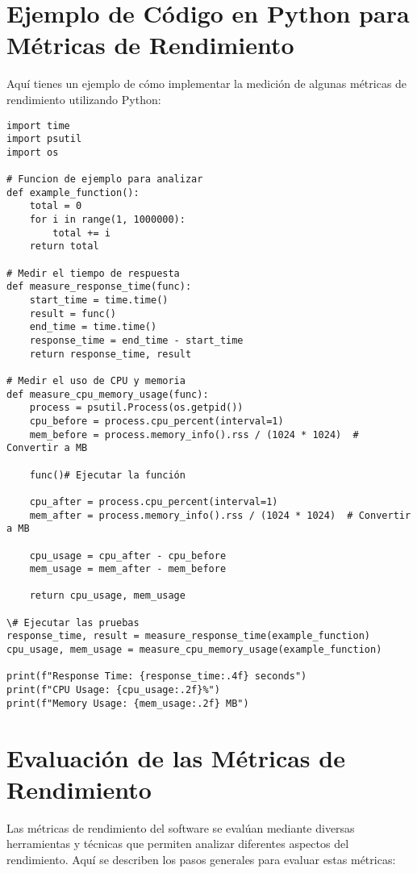 \documentclass{article}
\begin{document}
\section{Ejemplo de Código en Python para Métricas de Rendimiento}

Aquí tienes un ejemplo de cómo implementar la medición de algunas métricas de rendimiento utilizando Python:

\begin{verbatim}
import time
import psutil
import os

# Funcion de ejemplo para analizar
def example_function():
    total = 0
    for i in range(1, 1000000):
        total += i
    return total

# Medir el tiempo de respuesta
def measure_response_time(func):
    start_time = time.time()
    result = func()
    end_time = time.time()
    response_time = end_time - start_time
    return response_time, result

# Medir el uso de CPU y memoria
def measure_cpu_memory_usage(func):
    process = psutil.Process(os.getpid())
    cpu_before = process.cpu_percent(interval=1)
    mem_before = process.memory_info().rss / (1024 * 1024)  # Convertir a MB

    func()# Ejecutar la función

    cpu_after = process.cpu_percent(interval=1)
    mem_after = process.memory_info().rss / (1024 * 1024)  # Convertir a MB

    cpu_usage = cpu_after - cpu_before
    mem_usage = mem_after - mem_before

    return cpu_usage, mem_usage

\# Ejecutar las pruebas
response_time, result = measure_response_time(example_function)
cpu_usage, mem_usage = measure_cpu_memory_usage(example_function)

print(f"Response Time: {response_time:.4f} seconds")
print(f"CPU Usage: {cpu_usage:.2f}%")
print(f"Memory Usage: {mem_usage:.2f} MB")
\end{verbatim}

\section{Evaluación de las Métricas de Rendimiento}

Las métricas de rendimiento del software se evalúan mediante diversas herramientas y técnicas que permiten analizar diferentes aspectos del rendimiento. Aquí se describen los pasos generales para evaluar estas métricas:
\end{document}
